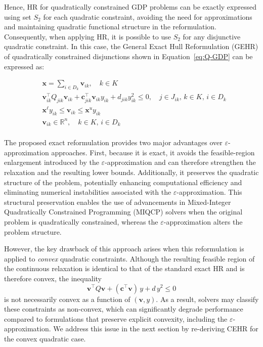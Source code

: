 \documentclass[11pt]{article}
\begin{document}
Hence, HR for quadratically constrained GDP problems can be exactly expressed using set \(S_2\) for each quadratic constraint, avoiding the need for approximations and maintaining quadratic functional structure in the reformulation.
Consequently, when applying HR, it is possible to use \(S_2\) for any disjunctive quadratic constraint. In this case, the General Exact Hull Reformulation (GEHR) of quadratically constrained disjunctions shown in Equation~\eqref{eq:Q-GDP} can be expressed as:

\begingroup
\begin{equation}
\begin{aligned}
    & \mathbf{x} = \sum_{i \in D_k} \mathbf{v}_{ik}, \quad k \in K \\
    & \mathbf{v}_{ik}^\top Q_{jik} \mathbf{v}_{ik} + \mathbf{c}^\top_{jik} \mathbf{v}_{ik} y_{ik} 
      + d_{jik} y_{ik}^2 \leq 0, \quad j \in J_{ik},\, k \in K,\, i \in D_k \\
    & \mathbf x^{\ell} y_{ik} \leq \mathbf{v}_{ik} \leq \mathbf{x}^u y_{ik} \\
    & \mathbf{v}_{ik} \in \mathbb{R}^n, \quad k \in K,\, i \in D_k \\
\end{aligned}
\label{eq:our-HR}
\end{equation}
\endgroup

The proposed exact reformulation provides two major advantages over \(\varepsilon\)-approximation approaches.
First, because it is exact, it avoids the feasible-region enlargement introduced by the $\varepsilon$-approximation and can therefore strengthen the relaxation and the resulting lower bounds.
Additionally, it preserves the quadratic structure of the problem, potentially enhancing computational efficiency and eliminating numerical instabilities associated with the \(\varepsilon\)-approximation.
This structural preservation enables the use of advancements in Mixed-Integer Quadratically Constrained Programming (MIQCP) solvers when the original problem is quadratically constrained, whereas the \(\varepsilon\)-approximation alters the problem structure.


However, the key drawback of this approach arises when this reformulation is applied to \emph{convex} quadratic constraints. 
Although the resulting feasible region of the continuous relaxation is identical to that of the standard exact HR and is therefore convex, the inequality
\[
\mathbf{v}^\top Q \mathbf{v} + (\mathbf{c}^\top \mathbf{v})\,y + d\,y^{2} \le 0
\]
is not necessarily convex as a function of $(\mathbf{v},y)$. 
As a result, solvers may classify these constraints as non-convex, which can significantly degrade performance compared to formulations that preserve explicit convexity, including the $\varepsilon$-approximation. 
We address this issue in the next section by re-deriving CEHR for the convex quadratic case.
\end{document}

